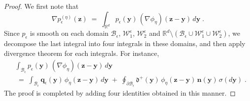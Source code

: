 \documentclass[reqno]{amsart}
\newcounter{as}[section]
\newcommand{\mc}[1]{{\mathcal #1}}
\newcommand{\mf}[1]{{\mathfrak #1}}
\newcommand{\bb}[1]{{\mathbb #1}}
\newcommand{\bs}[1]{{\boldsymbol #1}}
\newcommand{\<}{\langle}
\renewcommand{\>}{\rangle}
\begin{document}
\begin{proof}
We first note that
\begin{equation*}
\nabla p_{\epsilon}^{(\eta)}(\bs{z})\;=\;
\int_{\bb{R}^{d}} p_{\epsilon}(\bs{y}) \, (\nabla\phi_{\eta})
(\bs{z}-\bs{y}) \, d\bs{y}\;.
\end{equation*}
Since $p_{\epsilon}$ is smooth on each domain $\mc{B}_{\epsilon}$,
$\mc{W}_{1}^{\epsilon}$, $\mc{W}_{2}^{\epsilon}$ and $\bb{R}^{d}
\setminus \left(\mc{B}_{\epsilon} \cup \mc{W}_{1}^{\epsilon} \cup
  \mc{W}_{2}^{\epsilon}\right)$, we decompose the last integral into
four integrals in these domains, and then apply divergence theorem for
each integrals. For instance,
\begin{align*}
 &   \int_{\mc{B}_{\epsilon}} p_{\epsilon}(\bs{y}) \,
(\nabla\phi_{\eta})(\bs{z}-\bs{y}) \, d\bs{y} \\
 &   \;=\;\int_{\mc{B}_{\epsilon}} \bs{q}_{\epsilon}(\bs{y})\,
\phi_{\eta}(\bs{z}-\bs{y})\, d\bs{y}
\;+\; \oint_{\partial\mc{B}_{\epsilon}} \mf{d}^{+}(\bs{y})\,
\phi_{\eta}(\bs{z}-\bs{y})\, \bs{n}(\bs{y})\, \sigma(d\bs{y})\;.
\end{align*}
The proof is completed by adding four identities obtained in this
manner.
\end{proof}
\end{document}
